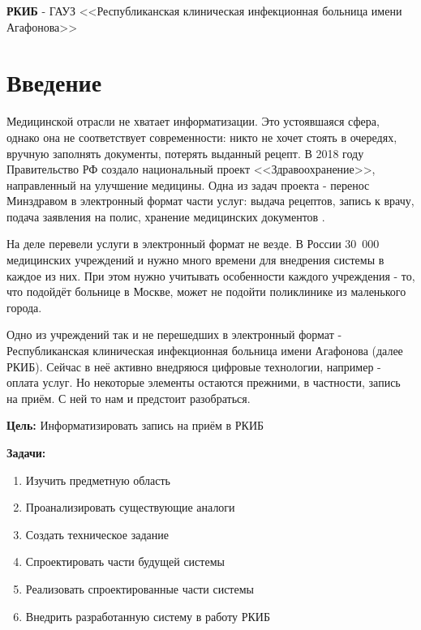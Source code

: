 \documentclass[a4paper,article]{article}
\begin{document}
    \textbf{РКИБ} - ГАУЗ <<Республиканская клиническая инфекционная больница имени Агафонова>>

    \newpage

    \section*{Введение}

        Медицинской отрасли не хватает информатизации. Это устоявшаяся сфера, однако она не соответствует современности: никто не хочет стоять в очередях, вручную заполнять документы, потерять выданный рецепт. В 2018 году Правительство РФ создало национальный проект <<Здравоохранение>>, направленный на улучшение медицины. Одна из задач проекта - перенос Минздравом в электронный формат части услуг: выдача рецептов, запись к врачу, подача заявления на полис, хранение медицинских документов \cite{natsproektzdravoohranenie}.

        На деле перевели услуги в электронный формат не везде. В России 30~000 медицинских учреждений и нужно много времени для внедрения системы в каждое из них. При этом нужно учитывать особенности каждого учреждения - то, что подойдёт больнице в Москве, может не подойти поликлинике из маленького города.

        Одно из учреждений так и не перешедших в электронный формат - Республиканская клиническая инфекционная больница имени Агафонова (далее РКИБ). Сейчас в неё активно внедряюся цифровые технологии, например - оплата услуг. Но некоторые элементы остаются прежними, в частности, запись на приём. С ней то нам и предстоит разобраться.

        \textbf{Цель:} Информатизировать запись на приём в РКИБ

        \textbf{Задачи:}

        \begin{enumerate}[nolistsep]
            \item Изучить предметную область
            \item Проанализировать существующие аналоги
            \item Создать техническое задание
            \item Спроектировать части будущей системы
            \item Реализовать спроектированные части системы
            \item Внедрить разработанную систему в работу РКИБ
        \end{enumerate}
\end{document}
